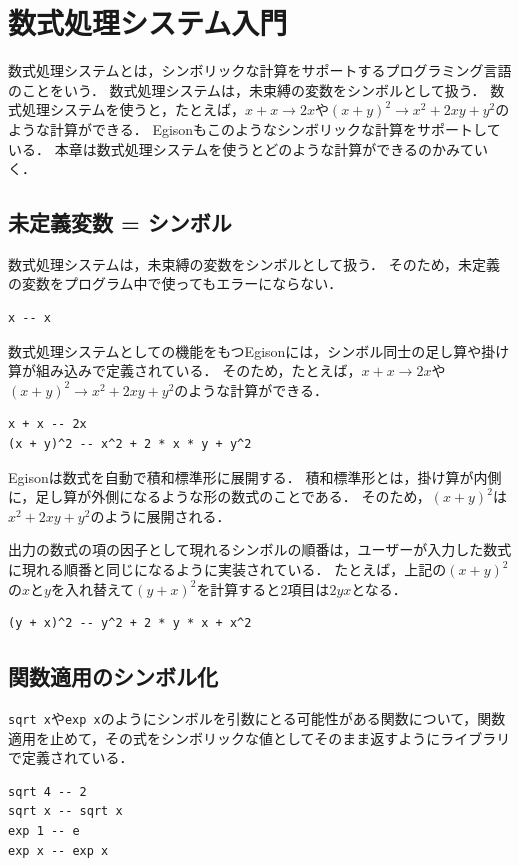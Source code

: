 \chapter{数式処理システム入門}\label{cas}

数式処理システムとは，シンボリックな計算をサポートするプログラミング言語のことをいう．
数式処理システムは，未束縛の変数をシンボルとして扱う．
数式処理システムを使うと，たとえば，$x + x \rightarrow 2x$や$(x + y)^2 \rightarrow x^2 + 2 x y + y^2$のような計算ができる．
Egisonもこのようなシンボリックな計算をサポートしている．
本章は数式処理システムを使うとどのような計算ができるのかみていく．

\section{未定義変数 = シンボル}\label{cas-symbol}

数式処理システムは，未束縛の変数をシンボルとして扱う．
そのため，未定義の変数をプログラム中で使ってもエラーにならない．
\begin{lstlisting}[language=egison,numbers=none]
x -- x
\end{lstlisting}

数式処理システムとしての機能をもつEgisonには，シンボル同士の足し算や掛け算が組み込みで定義されている．
そのため，たとえば，$x + x \rightarrow 2x$や$(x + y)^2 \rightarrow x^2 + 2 x y + y^2$のような計算ができる．
\begin{lstlisting}[language=egison,numbers=none]
x + x -- 2x
(x + y)^2 -- x^2 + 2 * x * y + y^2
\end{lstlisting}

Egisonは数式を自動で積和標準形に展開する．
積和標準形とは，掛け算が内側に，足し算が外側になるような形の数式のことである．
そのため，$(x + y)^2$は$x^2 + 2 x y + y^2$のように展開される．

出力の数式の項の因子として現れるシンボルの順番は，ユーザーが入力した数式に現れる順番と同じになるように実装されている．
たとえば，上記の$(x + y)^2$の$x$と$y$を入れ替えて$(y + x)^2$を計算すると$2$項目は$2 y x$となる．
\begin{lstlisting}[language=egison,numbers=none]
(y + x)^2 -- y^2 + 2 * y * x + x^2
\end{lstlisting}

\section{関数適用のシンボル化}\label{cas-symbol2}

\lstinline{sqrt x}や\lstinline{exp x}のようにシンボルを引数にとる可能性がある関数について，関数適用を止めて，その式をシンボリックな値としてそのまま返すようにライブラリで定義されている．
\begin{lstlisting}[language=egison,numbers=none]
sqrt 4 -- 2
sqrt x -- sqrt x
exp 1 -- e
exp x -- exp x
\end{lstlisting}

